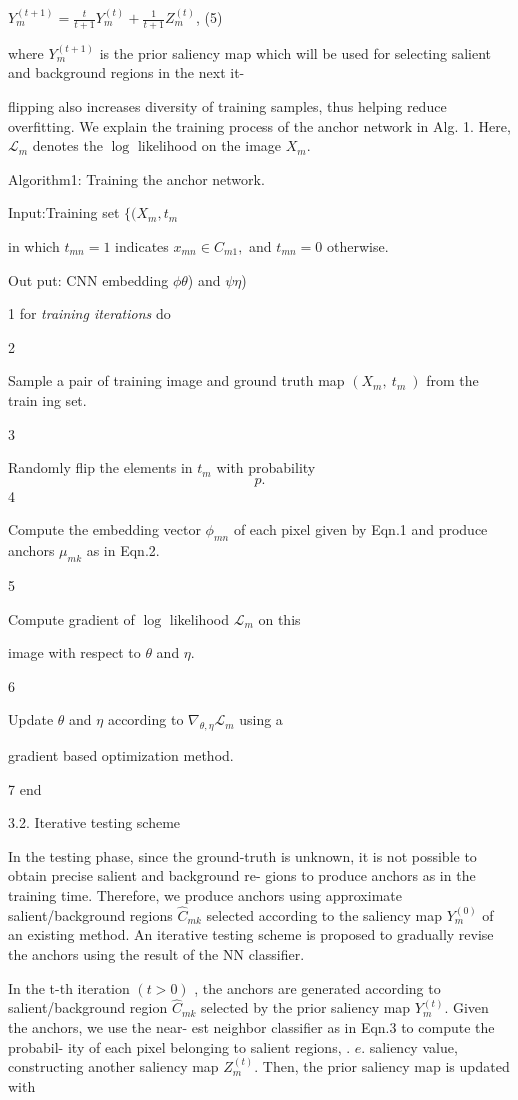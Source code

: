 \documentclass[a4paper,10pt]{article}
\begin{document}
$Y_{m}^{(t+1)}=\displaystyle \frac{t}{t+1}Y_{m}^{(t)}+\frac{1}{t+1}Z_{m}^{(t)}$, (5)

where $Y_{m}^{(t+1)}$ is the prior saliency map which will be used for selecting salient and background regions in the next it-

flipping also increases diversity of training samples, thus helping reduce overfitting. We explain the training process of the anchor network in Alg. 1. Here, $\mathcal{L}_{m}$ denotes the $\log$ likelihood on the image $X_{m}.$

Algorithm1: Training the anchor network.

Input:Training set $\{(X_{m}, t_{m}$

in which $t_{mn}=1$ indicates $x_{mn}\in C_{m1},$ and $t_{mn}=0$ otherwise.

Out put: CN$\mathrm{N}$ embedding $\phi \theta$) and $\psi \eta$)

1 for {\it training iterations} do

2

Sample a pair of training image and ground truth map $(X_{m},\ t_{m}\ )$ from the train ing set.

3

Randomly flip the elements in $t_{m}$ with probability
$$
p.
$$
4

Compute the embedding vector $\phi_{mn}$ of each pixel given by Eqn.1 and produce anchors $\mu_{mk}$ as in Eqn.2.

5

Compute gradient of $\log$ likelihood $\mathcal{L}_{m}$ on this

image with respect to $\theta$ and $\eta.$

6

Update $\theta$ and $\eta$ according to $\nabla_{\theta,\eta}\mathcal{L}_{m}$ using a

gradient based optimization method.

7 end

3.2. Iterative testing scheme

In the testing phase, since the ground-truth is unknown, it is not possible to obtain precise salient and background re- gions to produce anchors as in the training time. Therefore, we produce anchors using approximate salient/background regions $\hat{C}_{mk}$ selected according to the saliency map $Y_{m}^{(0)}$ of an existing method. An iterative testing scheme is proposed to gradually revise the anchors using the result of the NN classifier.

In the t-th iteration $(t>0)$ , the anchors are generated according to salient/background region $\hat{C}_{mk}$ selected by the prior saliency map $Y_{m}^{(t)}$. Given the anchors, we use the near- est neighbor classifier as in Eqn.3 to compute the probabil- ity of each pixel belonging to salient regions, . $e$. saliency value, constructing another saliency map $Z_{m}^{(t)}$. Then, the prior saliency map is updated with
\end{document}
